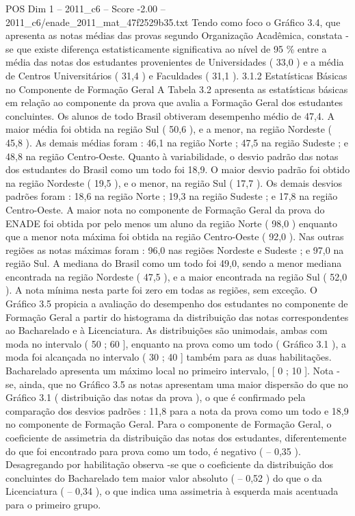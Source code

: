 \begin{textsample}{POS Dim 1 – 2011\_c6 – Score -2.00 – 2011\_c6/enade\_2011\_mat\_47f2529b35.txt}
Tendo como foco o Gráfico 3.4, que apresenta as notas médias das provas segundo Organização Acadêmica, constata -se que existe diferença estatisticamente significativa ao nível de 95 \% entre a média das notas dos estudantes provenientes de Universidades ( 33,0 ) e a média de Centros Universitários ( 31,4 ) e Faculdades ( 31,1 ). 3.1.2 Estatísticas Básicas no Componente de Formação Geral A Tabela 3.2 apresenta as estatísticas básicas em relação ao componente da prova que avalia a Formação Geral dos estudantes concluintes.
Os alunos de todo Brasil obtiveram desempenho médio de 47,4.
A maior média foi obtida na região Sul ( 50,6 ), e a menor, na região Nordeste ( 45,8 ).
As demais médias foram : 46,1 na região Norte ; 47,5 na região Sudeste ; e 48,8 na região Centro-Oeste.
Quanto à variabilidade, o desvio padrão das notas dos estudantes do Brasil como um todo foi 18,9.
O maior desvio padrão foi obtido na região Nordeste ( 19,5 ), e o menor, na região Sul ( 17,7 ).
Os demais desvios padrões foram : 18,6 na região Norte ; 19,3 na região Sudeste ; e 17,8 na região Centro-Oeste.
A maior nota no componente de Formação Geral da prova do ENADE foi obtida por pelo menos um aluno da região Norte ( 98,0 ) enquanto que a menor nota máxima foi obtida na região Centro-Oeste ( 92,0 ).
Nas outras regiões as notas máximas foram : 96,0 nas regiões Nordeste e Sudeste ; e 97,0 na região Sul.
A mediana do Brasil como um todo foi 49,0, sendo a menor mediana encontrada na região Nordeste ( 47,5 ), e a maior encontrada na região Sul ( 52,0 ).
A nota mínima nesta parte foi zero em todas as regiões, sem exceção.
O Gráfico 3.5 propicia a avaliação do desempenho dos estudantes no componente de Formação Geral a partir do histograma da distribuição das notas correspondentes ao Bacharelado e à Licenciatura.
As distribuições são unimodais, ambas com moda no intervalo ( 50 ; 60 ], enquanto na prova como um todo ( Gráfico 3.1 ), a moda foi alcançada no intervalo ( 30 ; 40 ] também para as duas habilitações.
Bacharelado apresenta um máximo local no primeiro intervalo, [ 0 ; 10 ].
Nota -se, ainda, que no Gráfico 3.5 as notas apresentam uma maior dispersão do que no Gráfico 3.1 ( distribuição das notas da prova ), o que é confirmado pela comparação dos desvios padrões : 11,8 para a nota da prova como um todo e 18,9 no componente de Formação Geral.
Para o componente de Formação Geral, o coeficiente de assimetria da distribuição das notas dos estudantes, diferentemente do que foi encontrado para prova como um todo, é negativo ( – 0,35 ).
Desagregando por habilitação observa -se que o coeficiente da distribuição dos concluintes do Bacharelado tem maior valor absoluto ( – 0,52 ) do que o da Licenciatura ( – 0,34 ), o que indica uma assimetria à esquerda mais acentuada para o primeiro grupo.

\end{textsample}
